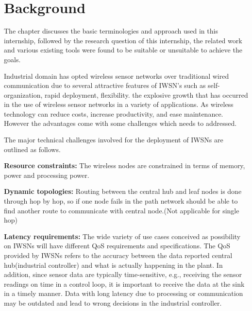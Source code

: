 \chapter{Background}

The chapter discusses the basic terminologies and approach used in this internship, followed by the
research question of this internship, the related work and various existing tools were found to be suitable or unsuitable to achieve the goals.


Industrial domain has opted wireless sensor networks over traditional wired communication due to several attractive features of IWSN's such as self-organization, rapid deployment, flexibility.  the explosive growth that has occurred in the use of wireless sensor networks in a variety of applications. As wireless technology can reduce costs, increase productivity, and ease maintenance. However the advantages come with some challenges which needs to addressed.

The major technical challenges involved for the deployment of IWSNs are outlined as follows.

\textbf{Resource constraints:} The wireless nodes are constrained in terms of memory, power and processing power.

\textbf{Dynamic topologies:} Routing between the central hub and leaf nodes is done through hop by hop, so if one node fails in the path network should be able to find another route to communicate with central node.(Not applicable for single hop)

\textbf{Latency requirements:} The wide variety of use cases conceived as possibility on IWSNs will have different QoS requirements and specifications. The QoS provided by IWSNs refers to the accuracy between the data reported central hub(industrial controller) and what is actually happening in the plant. In addition, since sensor data are typically time-sensitive, e.g., receiving the sensor readings on time in a control loop, it is important to receive the data at the sink in a timely manner. Data with long latency due to processing or communication may be outdated and lead to wrong decisions in the industrial controller.

